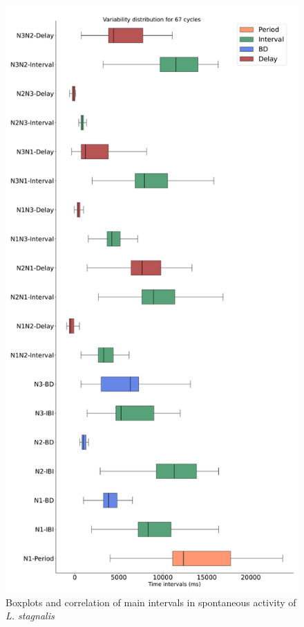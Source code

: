 \begin{figure}[bth!]
	\centering
	\includegraphics[width=\textwidth]{img/invariants/prep3_3 intervals panel.pdf}
	\caption{Boxplots and correlation of main intervals in spontaneous activity of \textit{L. stagnalis}}
	\label{fig:prep3 invariants}
\end{figure}




